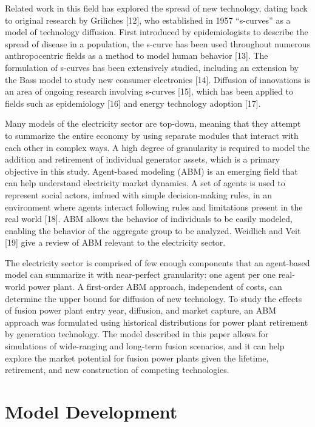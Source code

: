 \documentclass[preprint, 12pt]{elsarticle}
\begin{document}
Related work in this field has explored the spread of new technology, dating back to original research by Griliches [12], who established in 1957 “s-curves” as a model of technology diffusion. First introduced by epidemiologists to describe the spread of disease in a population, the s-curve has been used throughout numerous anthropocentric fields as a method to model human behavior [13]. The formulation of s-curves has been extensively studied, including an extension by the Bass model to study new consumer electronics [14]. Diffusion of innovations is an area of ongoing research involving s-curves [15], which has been applied to fields such as epidemiology [16] and energy technology adoption [17].

Many models of the electricity sector are top-down, meaning that they attempt to summarize the entire economy by using separate modules that interact with each other in complex ways. A high degree of granularity is required to model the addition and retirement of individual generator assets, which is a primary objective in this study. Agent-based modeling (ABM) is an emerging field that can help understand electricity market dynamics. A set of agents is used to represent social actors, imbued with simple decision-making rules, in an environment where agents interact following rules and limitations present in the real world [18].  ABM allows the behavior of individuals to be easily modeled, enabling the behavior of the aggregate group to be analyzed. Weidlich and Veit [19] give a review of ABM relevant to the electricity sector.

The electricity sector is comprised of few enough components that an agent-based model can summarize it with near-perfect granularity: one agent per one real-world power plant. A first-order ABM approach, independent of costs, can determine the upper bound for diffusion of new technology. To study the effects of fusion power plant entry year, diffusion, and market capture, an ABM approach was formulated using historical distributions for power plant retirement by generation technology. The model described in this paper allows for simulations of wide-ranging and long-term fusion scenarios, and it can help explore the market potential for fusion power plants given the lifetime, retirement, and new construction of competing technologies.

\section{Model Development}
\end{document}
